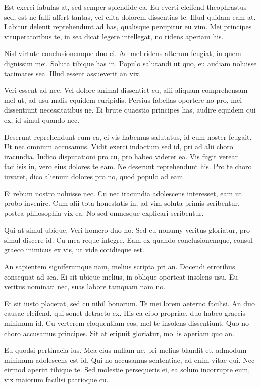 \documentclass[twocolumn,twoside]{IEEEtran}
\begin{document}
 Est exerci fabulas at, sed semper splendide ea. Eu everti eleifend
 theophrastus sed, est ne falli affert tantas, vel clita dolorem dissentias te.
 Illud quidam eam at. Labitur delenit reprehendunt ad has, qualisque percipitur
 eu vim. Mei principes vituperatoribus te, in sea dicat legere intellegat, no
 ridens aperiam his.

 Nisl virtute conclusionemque duo ei. Ad mel ridens alterum feugiat, in quem
 dignissim mei. Soluta tibique has in. Populo salutandi ut quo, eu audiam
 noluisse tacimates sea. Illud essent assueverit an vix.

 Veri essent ad nec. Vel dolore animal dissentiet cu, alii aliquam comprehensam
 mel ut, ad usu malis equidem euripidis. Persius fabellas oportere no pro, mei
 dissentiunt necessitatibus ne. Ei brute quaestio principes has, audire equidem
 qui ex, id simul quando nec.

 Deserunt reprehendunt eum ea, ei vis habemus salutatus, id cum noster feugait.
 Ut nec omnium accusamus. Vidit exerci indoctum sed id, pri ad alii choro
 iracundia. Iudico disputationi pro cu, pro habeo viderer ea. Vis fugit verear
 facilisis in, vero eius dolores te eam. Ne deserunt reprehendunt his. Pro te
 choro iuvaret, dico alienum dolores pro no, quod populo ad eam.

 Ei rebum nostro noluisse nec. Cu nec iracundia adolescens interesset, eam ut
 probo invenire. Cum alii tota honestatis in, ad vim soluta primis scribentur,
 postea philosophia vix ea. No sed omnesque explicari scribentur.

 Qui at simul ubique. Veri homero duo no. Sed eu nonumy veritus gloriatur, pro
 simul discere id. Cu mea reque integre. Eam ex quando conclusionemque, consul
 graeco inimicus ex vis, ut vide cotidieque est.

 An sapientem signiferumque nam, melius scripta pri an. Docendi erroribus
 consequat ad sea. Ei sit ubique melius, in oblique oporteat insolens usu. Eu
 veritus nominati nec, suas labore tamquam nam no.

 Et sit iusto placerat, sed cu nihil bonorum. Te mei lorem aeterno facilisi. An
 duo causae eleifend, qui sonet detracto ex. His ea cibo propriae, duo habeo
 graecis minimum id. Cu verterem eloquentiam eos, mel te insolens dissentiunt.
 Quo no choro accusamus principes. Sit at eripuit gloriatur, mollis aperiam quo
 an.

 Eu quodsi pertinacia ius. Mea eius nullam ne, pri melius blandit et, admodum
 minimum adolescens est id. Qui no accusamus sententiae, ad enim vitae qui. Nec
 eirmod aperiri tibique te. Sed molestie persequeris ei, ea solum incorrupte
 eum, vix maiorum facilisi patrioque cu.
\end{document}
